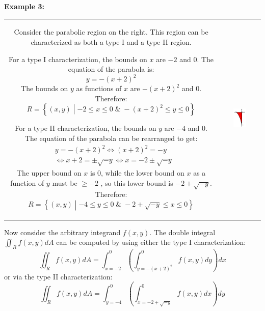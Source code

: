 \documentclass{article}
\begin{document}
\pagebreak

\textbf{Example 3:}  

\vspace{5mm}

\begin{tabular}{cc}
\parbox{0.5\textwidth}{
Consider the parabolic region on the right. This region can be characterized as both a type I and a type II region.    

For a type I characterization, the bounds on \(x\) are \(-2\) and \(0\). The equation of the parabola is:
\[y = -(x + 2)^2\]
The bounds on \(y\) as functions of \(x\) are \(-(x + 2)^2\) and \(0\). Therefore:
\[R = \left\{(x,y) \middle| -2 \leq x \leq 0 \;\&\; -(x + 2)^2 \leq y \leq 0\right\}\]

For a type II characterization, the bounds on \(y\) are \(-4\) and \(0\). The equation of the parabola can be rearranged to get: 
\begin{align*}
& y = -(x + 2)^2 \iff (x + 2)^2 = -y \\
& \iff x + 2 = \pm\sqrt{-y} \iff x = -2 \pm\sqrt{-y}
\end{align*}
The upper bound on \(x\) is \(0\), while the lower bound on \(x\) as a function of \(y\) must be \(\geq -2\) , so this lower bound is \(-2 + \sqrt{-y}\). Therefore:
\[R = \left\{(x,y) \middle| -4 \leq y \leq 0 \;\&\; -2 + \sqrt{-y} \leq x \leq 0\right\}\]

} & \parbox{0.5\textwidth}{
\includegraphics[width = 0.35\textwidth]{Example_3}
}
\end{tabular}
Now consider the arbitrary integrand \(f(x,y)\). The double integral \(\iint_R f(x,y)dA\) can be computed by using either the type I characterization: 
\[\iint_R f(x,y)dA = \int_{x = -2}^0 \left(\int_{y = -(x + 2)^2}^0 f(x,y)dy\right)dx\] 
or via the type II characterization: 
\[\iint_R f(x,y)dA = \int_{y = -4}^0 \left(\int_{x = -2 + \sqrt{-y}}^{0} f(x,y)dx\right)dy\]
\end{document}
